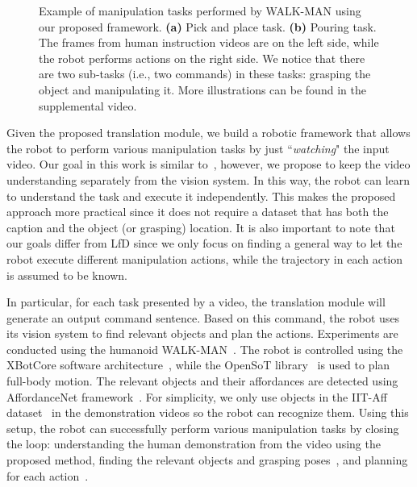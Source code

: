 \begin{figure*}[ht]
  \centering
    
     
 \vspace{2.0ex}
 \caption{Example of manipulation tasks performed by WALK-MAN using our proposed framework. \textbf{(a)} Pick and place task. \textbf{(b)} Pouring task. The frames from human instruction videos are on the left side, while the robot performs actions on the right side. We notice that there are two sub-tasks (i.e., two commands) in these tasks: grasping the object and manipulating it. More illustrations can be found in the supplemental video.}
 \label{Fig:robot_imitation}
\end{figure*}



Given the proposed translation module, we build a robotic framework that allows the robot to perform various manipulation tasks by just ``\textit{watching}" the input video. Our goal in this work is similar to~\cite{Yang2015}, however, we propose to keep the video understanding separately from the vision system. In this way, the robot can learn to understand the task and execute it independently. This makes the proposed approach more practical since it does not require a dataset that has both the caption and the object (or grasping) location. It is also important to note that our goals differ from LfD since we only focus on finding a general way to let the robot execute different manipulation actions, while the trajectory in each action is assumed to be known.

In particular, for each task presented by a video, the translation module will generate an output command sentence. Based on this command, the robot uses its vision system to find relevant objects and plan the actions. Experiments are conducted using the humanoid WALK-MAN~\cite{Niko2016_full}. The robot is controlled using the XBotCore software architecture~\cite{muratore2017xbotcore}, while the OpenSoT library~\cite{Rocchi15} is used to plan full-body motion. The relevant objects and their affordances are detected using AffordanceNet framework~\cite{AffordanceNet17}. For simplicity, we only use objects in the IIT-Aff dataset~\cite{Nguyen2017_Aff} in the demonstration videos so the robot can recognize them. Using this setup, the robot can successfully perform various manipulation tasks by closing the loop: understanding the human demonstration from the video using the proposed method, finding the relevant objects and grasping poses~\cite{Nguyen2017_Aff}, and planning for each action~\cite{Rocchi15}.


